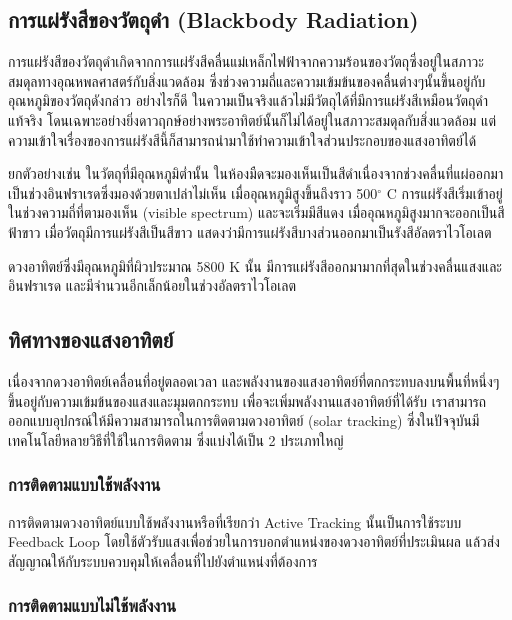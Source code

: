 \documentclass[11pt]{article}
\begin{document}
\subsection{การแผ่รังสีของวัตถุดำ (Blackbody Radiation)}
\label{sec:org9574d41}

การแผ่รังสีของวัตถุดำเกิดจากการแผ่รังสีคลื่นแม่เหล็กไฟฟ้าจากความร้อนของวัตถุซึ่งอยู่ในสภาวะสมดุลทางอุณหพลศาสตร์กับสิ่งแวดล้อม ซึ่งช่วงความถี่และความเข้มข้นของคลื่นต่างๆนั้นขึ้นอยู่กับอุณหภูมิของวัตถุดังกล่าว อย่างไรก็ดี ในความเป็นจริงแล้วไม่มีวัตถุได้ที่มีการแผ่รังสีเหมือนวัตถุดำแท้จริง โดนเฉพาะอย่างยิ่งดาวฤกษ์อย่างพระอาทิตย์นั้นก็ไม่ได้อยู่ในสภาวะสมดุลกับสิ่งแวดล้อม แต่ความเข้าใจเรื่องของการแผ่รังสีนี้ก็สามารถนำมาใช้ทำความเข้าใจส่วนประกอบของแสงอาทิตย์ได้

ยกตัวอย่างเช่น ในวัตถุที่มีอุณหภูมิต่ำนั้น ในห้องมืดจะมองเห็นเป็นสีดำเนื่องจากช่วงคลื่นที่แผ่ออกมาเป็นช่วงอินฟราเรดซึ่งมองด้วยตาเปล่าไม่เห็น เมื่ออุณหภูมิสูงขึ้นถึงราว 500\(^{\circ}\) C การแผ่รังสีเริ่มเข้าอยู่ในช่วงความถี่ที่ตามองเห็น (visible spectrum) และจะเริ่มมีสีแดง เมื่ออุณหภูมิสูงมากจะออกเป็นสีฟ้าขาว เมื่อวัตถุมีการแผ่รังสีเป็นสีขาว แสดงว่ามีการแผ่รังสีบางส่วนออกมาเป็นรังสีอัลตราไวโอเลต

ดวงอาทิตย์ซึ่งมีอุณหภูมิที่ผิวประมาณ 5800 K นั้น มีการแผ่รังสีออกมามากที่สุดในช่วงคลื่นแสงและอินฟราเรด และมีจำนวนอีกเล็กน้อยในช่วงอัลตราไวโอเลต

\subsection{ทิศทางของแสงอาทิตย์}
\label{sec:orgcf41d51}

เนื่องจากดวงอาทิตย์เคลื่อนที่อยู่ตลอดเวลา และพลังงานของแสงอาทิตย์ที่ตกกระทบลงบนพื้นที่หนึ่งๆขึ้นอยู่กับความเข้มข้นของแสงและมุมตกกระทบ เพื่อจะเพิ่มพลังงานแสงอาทิตย์ที่ได้รับ เราสามารถออกแบบอุปกรณ์ให้มีความสามารถในการติดตามดวงอาทิตย์ (solar tracking) ซึ่งในปัจจุบันมีเทคโนโลยีหลายวิธีที่ใช้ในการติดตาม ซึ่งแบ่งได้เป็น 2 ประเภทใหญ่

\subsubsection{การติดตามแบบใช้พลังงาน}
\label{sec:org79d6725}

การติดตามดวงอาทิตย์แบบใช้พลังงานหรือที่เรียกว่า Active Tracking นั้นเป็นการใช้ระบบ Feedback Loop โดยใช้ตัวรับแสงเพื่อช่วยในการบอกตำแหน่งของดวงอาทิตย์ที่ประเมินผล แล้วส่งสัญญาณให้กับระบบควบคุมให้เคลื่อนที่ไปยังตำแหน่งที่ต้องการ

\subsubsection{การติดตามแบบไม่ใช้พลังงาน}
\label{sec:org7c249ef}
\end{document}
